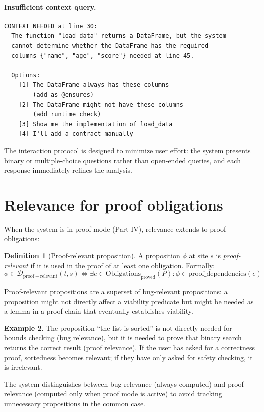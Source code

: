 \documentclass[11pt]{report}
\theoremstyle{definition}
\newtheorem{definition}{Definition}[section]
\newtheorem{example}[definition]{Example}
\theoremstyle{plain}
\begin{document}
\paragraph{Insufficient context query.}
\begin{lstlisting}[language={}]
CONTEXT NEEDED at line 30:
  The function "load_data" returns a DataFrame, but the system
  cannot determine whether the DataFrame has the required
  columns {"name", "age", "score"} needed at line 45.

  Options:
    [1] The DataFrame always has these columns
        (add as @ensures)
    [2] The DataFrame might not have these columns
        (add runtime check)
    [3] Show me the implementation of load_data
    [4] I'll add a contract manually
\end{lstlisting}

The interaction protocol is designed to minimize user effort: the system
presents binary or multiple-choice questions rather than open-ended queries,
and each response immediately refines the analysis.

\section{Relevance for proof obligations}

When the system is in proof mode (Part IV), relevance extends to proof
obligations:

\begin{definition}[Proof-relevant proposition]
A proposition $\phi$ at site $s$ is \emph{proof-relevant} if it is used in
the proof of at least one obligation. Formally:
\[
  \phi \in \mathcal{D}_{\mathrm{proof-relevant}}(t, s) \iff
  \exists e \in \mathrm{Obligations}_{\mathrm{proved}}(P) :
  \phi \in \mathrm{proof\_dependencies}(e)
\]
\end{definition}

Proof-relevant propositions are a superset of bug-relevant propositions: a
proposition might not directly affect a viability predicate but might be needed
as a lemma in a proof chain that eventually establishes viability.

\begin{example}
The proposition ``the list is sorted'' is not directly needed for bounds
checking (bug relevance), but it is needed to prove that binary search
returns the correct result (proof relevance). If the user has asked for a
correctness proof, sortedness becomes relevant; if they have only asked for
safety checking, it is irrelevant.
\end{example}

The system distinguishes between bug-relevance (always computed) and
proof-relevance (computed only when proof mode is active) to avoid tracking
unnecessary propositions in the common case.
\end{document}
